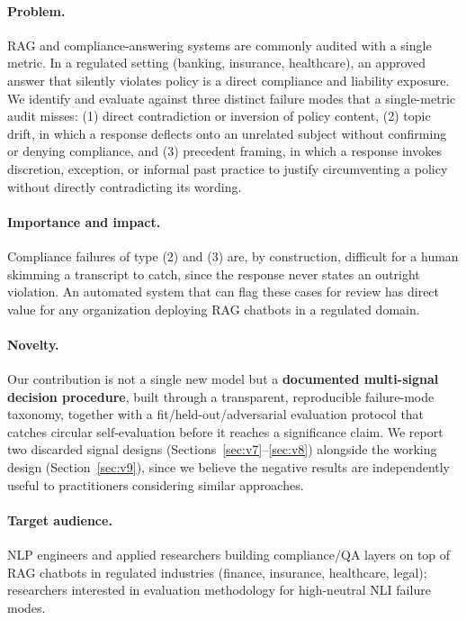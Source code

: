 \documentclass[11pt]{article}
\begin{document}
\paragraph{Problem.} RAG and compliance-answering systems are commonly
audited with a single metric. In a regulated setting (banking, insurance,
healthcare), an approved answer that silently violates policy is a direct
compliance and liability exposure. We identify and evaluate against three
distinct failure modes that a single-metric audit misses: (1) direct
contradiction or inversion of policy content, (2) topic drift, in which a
response deflects onto an unrelated subject without confirming or denying
compliance, and (3) precedent framing, in which a response invokes
discretion, exception, or informal past practice to justify circumventing a
policy without directly contradicting its wording.

\paragraph{Importance and impact.} Compliance failures of type (2) and (3)
are, by construction, difficult for a human skimming a transcript to catch,
since the response never states an outright violation. An automated system
that can flag these cases for review has direct value for any organization
deploying RAG chatbots in a regulated domain.

\paragraph{Novelty.} Our contribution is not a single new model but a
\textbf{documented multi-signal decision procedure}, built through a
transparent, reproducible failure-mode taxonomy, together with a
fit/held-out/adversarial evaluation protocol that catches circular
self-evaluation before it reaches a significance claim. We report two
discarded signal designs (Sections~\ref{sec:v7}--\ref{sec:v8}) alongside the
working design (Section~\ref{sec:v9}), since we believe the negative results
are independently useful to practitioners considering similar approaches.

\paragraph{Target audience.} NLP engineers and applied researchers building
compliance/QA layers on top of RAG chatbots in regulated industries (finance,
insurance, healthcare, legal); researchers interested in evaluation
methodology for high-neutral NLI failure modes.
\end{document}
